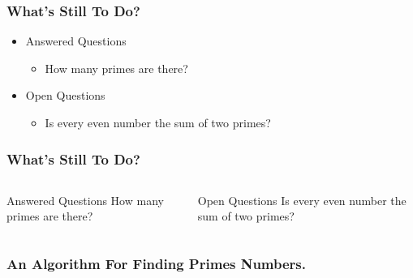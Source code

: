 \documentclass{beamer}
\begin{document}
\begin{frame}
    \frametitle{What’s Still To Do?} %
        \begin{itemize}
        \item Answered Questions
            \begin{itemize}
                \item How many primes are there?
            \end{itemize}
        \item Open Questions
            \begin{itemize}
                \item Is every even number the sum of two primes?
            \end{itemize}
    \end{itemize}
\end{frame}

\begin{frame}
    \frametitle{What's Still To Do?} %
    \begin{columns}
        \begin{block}{Answered Questions}
            How many primes are there?
        \end{block}     
        \begin{block}{Open Questions}
            Is every even number the sum of two primes?
            \cite{Goldbach1742}
        \end{block}
    \end{columns}
\end{frame}

\begin{frame}[fragile]
\frametitle{An Algorithm For Finding Primes Numbers.} %
    \begin{semiverbatim}
    \end{semiverbatim}
\end{frame}
\end{document}
